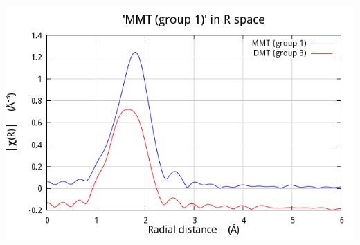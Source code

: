\documentclass[10pt, xcolor=x11names, compress]{beamer}
\begin{document}
\begin{frame}[fragile,label=methyltin]
\begin{columns}[T]
\begin{column}{0.4\linewidth}
      \includegraphics[width=0.85\linewidth]{mkw/data_chir.png}
    \end{column}
  \end{columns}

\end{frame}
\end{document}
